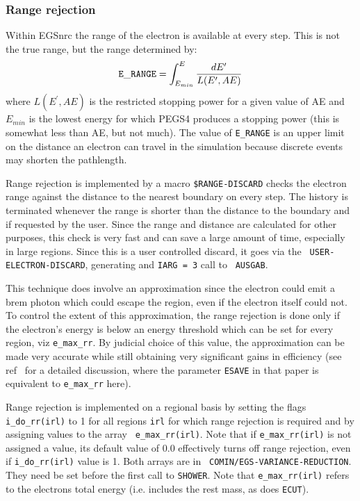 \subsubsection{Range rejection}
\label{range_rejection}

Within EGSnrc the range of the electron is available at every step. This is
not the true range, but the range determined by:
\[ {\tt E\_RANGE} = \int_{E_{min}}^E \frac{dE^\prime}{L(E^\prime,AE)}\]
where $L(E^\prime,AE)$ is the restricted stopping power for a given value
of AE and $E_{min}$ is the lowest energy for which PEGS4 produces a
stopping power (this is somewhat less than AE, but not much).
The value of {\tt E\_RANGE} is an
upper limit on the distance an electron can travel in the simulation
because discrete events may shorten the pathlength.

Range rejection is implemented by a macro {\tt \$RANGE-DISCARD} checks
the electron range against the distance to the nearest boundary on
every step. The history is terminated whenever the range is shorter than
the distance to the boundary and if requested by the user.  Since the
range and distance are calculated for other purposes, this check is
very fast and can save a large amount of time, especially in large
regions. Since this is a user controlled discard, it goes via the {\tt
USER-ELECTRON-DISCARD}, generating and {\tt {\tt IARG} = 3}   call to {\tt
AUSGAB}.
   

This technique
does involve an approximation since the electron could emit a
brem photon which could escape the region, even if the electron
itself could not.  To control the extent of this approximation, the range
rejection is done only if the electron's energy is below an energy
threshold which can be set for every region, viz {\tt e\_max\_rr}. By
judicial choice of this value, the approximation can be made very accurate
while still obtaining very significant gains in efficiency (see
ref~\cite{Ro95} for a detailed discussion, where the parameter {\tt ESAVE}
in that paper is equivalent to {\tt e\_max\_rr} here).

Range rejection is implemented on a regional basis by setting the flags
{\tt i\_do\_rr(irl)} to 1 for all regions {\tt irl} for which range
rejection is required and by assigning values to the array {\tt
e\_max\_rr(irl)}. Note that if {\tt e\_max\_rr(irl)} is not assigned a value,
its default value of 0.0 effectively turns off range rejection, even
if {\tt i\_do\_rr(irl)} value is 1.  Both arrays are in {\tt
COMIN/EGS-VARIANCE-REDUCTION}. They need be set before the first
call to {\tt SHOWER}.  Note that {\tt e\_max\_rr(irl)} refers to the
electrons total energy (i.e. includes the rest mass, as does {\tt ECUT}).
 
 

